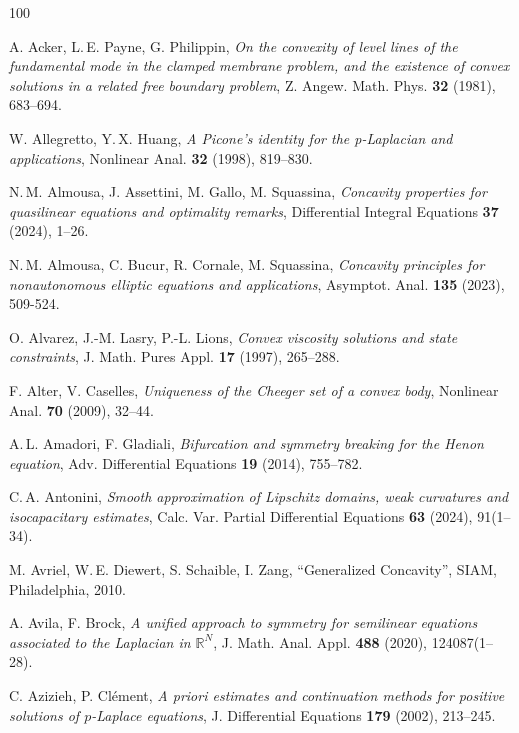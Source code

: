 \documentclass[11pt, reqno]{amsart}
\theoremstyle{definition}
\numberwithin{equation}{section}
\newcommand{\R}{\mathbb{R}}
\begin{document}
\begin{thebibliography}{100}

\small

 A. Acker, L.$\,$E. Payne, G. Philippin,
\emph{On the convexity of level lines of the fundamental mode in the clamped membrane problem, and the existence of convex solutions in a related free boundary problem},
Z. Angew. Math. Phys. \textbf{32} (1981), %
683--694. 

 W. Allegretto, Y.$\,$X. Huang,
\emph{A Picone's identity for the p-Laplacian and applications},
Nonlinear Anal. \textbf{32} (1998), %
819--830.

 N.$\,$M. Almousa, J. Assettini, M. Gallo, M. Squassina,
\emph{Concavity properties for quasilinear equations and optimality remarks},
Differential Integral Equations \textbf{37} (2024), %
1--26. 

 N.$\,$M. Almousa, C. Bucur, R. Cornale, M. Squassina,
\emph{Concavity principles for nonautonomous elliptic equations and applications},
Asymptot. Anal. \textbf{135} (2023), %
509-524.

 O. Alvarez, J.-M. Lasry, P.-L. Lions,
\emph{Convex viscosity solutions and state constraints},
J. Math. Pures Appl. \textbf{17} (1997), %
265--288.

 F. Alter, V. Caselles, 
\emph{Uniqueness of the Cheeger set of a convex body},
Nonlinear Anal. \textbf{70} (2009), 32--44.

 A.$\,$L. Amadori, F. Gladiali,
\emph{Bifurcation and symmetry breaking for the Henon equation},
Adv. Differential Equations \textbf{19} (2014), %
755--782. 

 C.$\,$A. Antonini, 
\emph{Smooth approximation of Lipschitz domains, weak curvatures and isocapacitary estimates}, 
Calc. Var. Partial Differential Equations \textbf{63} (2024), 91(1--34). %

 M. Avriel, W.$\,$E. Diewert, S. Schaible, I. Zang,
``Generalized Concavity'',
SIAM, Philadelphia, 2010.

 A. Avila, F. Brock,
\emph{A unified approach to symmetry for semilinear equations associated to the Laplacian in $\R^N$},
J. Math. Anal. Appl. \textbf{488} (2020), %
124087(1--28).

 C. Azizieh, P. Clément,
\emph{A priori estimates and continuation methods for positive solutions of $p$-Laplace equations},
J. Differential Equations \textbf{179} (2002), 213--245.


\end{thebibliography}
\end{document}
